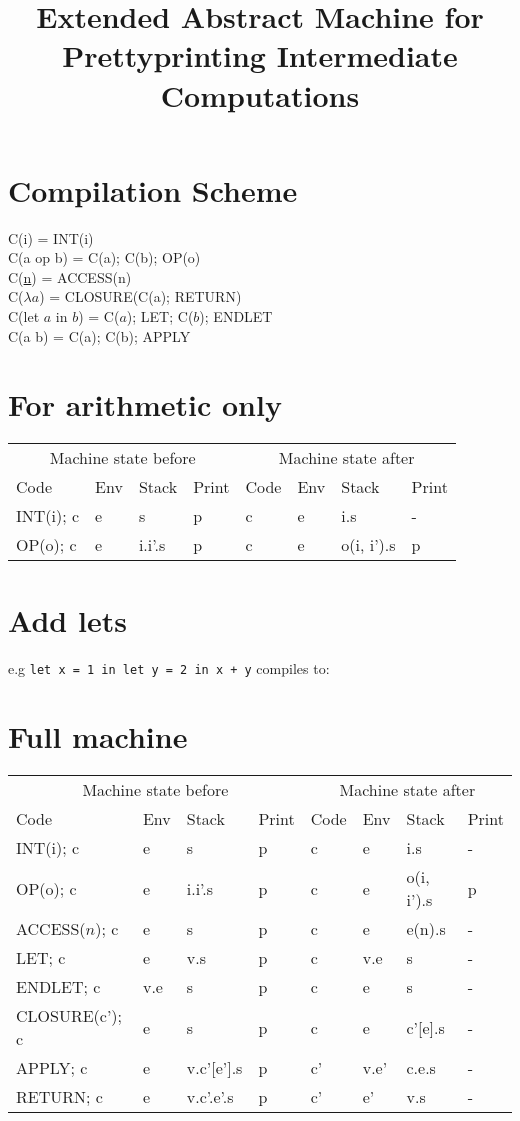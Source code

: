 \documentclass[11pt]{article}
\begin{document}
\title{Extended Abstract Machine for Prettyprinting Intermediate Computations}
\maketitle

\section{Compilation Scheme}

C(i) = INT(i)\\
C(a op b) = C(a); C(b); OP(o)\\
C(\underline{n}) = ACCESS(n)\\
C($\lambda a$) = CLOSURE(C(a); RETURN)\\
C(let $a$ in $b$) = C($a$); LET; C($b$); ENDLET\\
C(a b) = C(a); C(b); APPLY


\section{For arithmetic only}
\begin{tabular}{l|l|l|l||l|l|l|l}
\multicolumn{4}{c}{Machine state before}&
\multicolumn{4}{c}{Machine state after}\\
Code & Env & Stack & Print & Code & Env & Stack & Print\\
INT(i); c & e & s & p & c & e & i.s & -\\
OP(o); c & e & i.i'.s & p & c & e & o(i, i').s & p\\
\end{tabular}

\section{Add lets}

e.g \texttt{let x = 1 in let y = 2 in x + y} compiles to:



\section{Full machine}

\begin{tabular}{l|l|l|l||l|l|l|l}
\multicolumn{4}{c}{Machine state before}&
\multicolumn{4}{c}{Machine state after}\\
Code & Env & Stack & Print & Code & Env & Stack & Print\\
INT(i); c & e & s & p & c & e & i.s & -\\
OP(o); c & e & i.i'.s & p & c & e & o(i, i').s & p\\
ACCESS($n$); c & e & s & p & c & e & e(n).s & - \\
LET; c & e & v.s & p & c & v.e & s & -\\
ENDLET; c & v.e & s & p & c & e & s & -\\
CLOSURE(c'); c & e & s & p & c & e & c'[e].s & -\\
APPLY; c & e & v.c'[e'].s & p & c' & v.e' & c.e.s & -\\
RETURN; c & e & v.c'.e'.s & p & c' & e' & v.s & -\\
\end{tabular}
\end{document}
